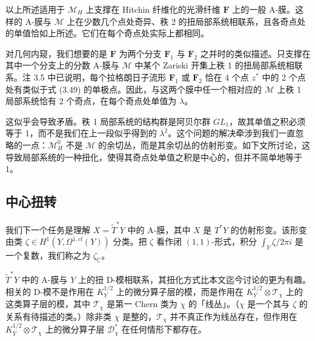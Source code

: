 \documentclass[11pt,a4paper]{article}
\begin{document}
以上所述适用于 $\mathcal{M}_H$ 上支撑在 Hitchin 纤维化的光滑纤维 $\boldsymbol{F}$ 上的一般 A-膜。这样的 A-膜与
$\mathcal{M}$ 上在少数几个点处奇异、秩 2 的扭局部系统相联系，且各奇点处的单值恰如上所述。它们在每个奇点处实际上都相同。

对几何内窥，我们想要的是 $\boldsymbol{F}$ 为两个分支 $\boldsymbol{F}_1$ 与 $\boldsymbol{F}_2$ 之并时的类似描述。只支撑在其中一个分支上的分数 A-膜与 $\mathcal{M}$ 中某个 Zariski 开集上秩 1 的扭局部系统相联系。注 3.5 中已说明，每个拉格朗日子流形 $\boldsymbol{F}_1$ 或 $\boldsymbol{F}_2$ 恰在 4 个点 $z^*$ 中的 2 个点处有类似于式 (3.49) 的单极点。因此，与这两个膜中任一个相对应的 $\mathcal{M}$ 上秩 1 局部系统恰有 2 个奇点，在每个奇点处单值为 $\lambda$。

这似乎会导致矛盾。秩 1 局部系统的结构群是阿贝尔群 $GL_1$，故其单值之积必须等于 1，而不是我们在上一段似乎得到的 $\lambda^2$。这个问题的解决牵涉到我们一直忽略的一点：$\mathcal{M}_H^0$ 不是 $\mathcal{M}$ 的余切丛，而是其余切丛的仿射形变。如下文所讨论，这导致局部系统的一种扭化，使得其奇点处单值之积是中心的，但并不简单地等于 1。


\subsection{中心扭转}

我们下一个任务是理解 $X=\widetilde{T}^*Y$ 中的 A-膜，其中 $X$ 是 $T^*Y$ 的仿射形变。该形变由类 $\zeta\in H^1(Y,\Omega^{1,cl}(Y))$ 分类。把 $\zeta$ 看作闭 $(1,1)$-形式，积分 $\int_Y\zeta/2\pi i$ 是一个复数，我们称之为 $\zeta_{\mathbb{C}}$。

$\widetilde{T}^*Y$ 中的 A-膜与 $Y$ 上的扭 D-模相联系，其扭化方式比本文迄今讨论的更为有趣。相关的 D-模不是作用在 $K_Y^{1/2}$ 上的微分算子层的模，而是作用在 $K_Y^{1/2}\otimes\mathcal{T}_\chi$ 上的这类算子层的模，其中 $\mathcal{T}_\chi$ 是第一 Chern 类为 $\chi$ 的「线丛」。（$\chi$ 是一个其与 $\zeta$ 的关系有待描述的类。）除非类 $\chi$ 是整的，$\mathcal{T}_\chi$ 并不真正作为线丛存在，但作用在 $K_Y^{1/2}\otimes\mathcal{T}_\chi$ 上的微分算子层 $\mathcal{D}_\chi^*$ 在任何情形下都存在。
\end{document}
